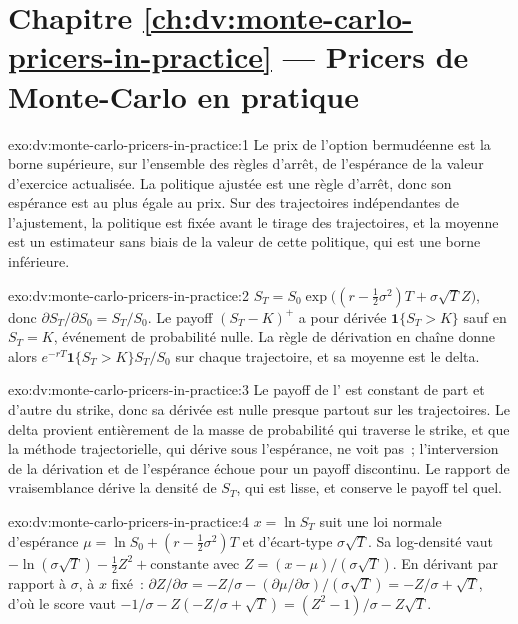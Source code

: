 \section*{Chapitre \ref{ch:dv:monte-carlo-pricers-in-practice} --- Pricers de Monte-Carlo en pratique}

\begin{solution}{exo:dv:monte-carlo-pricers-in-practice:1}
Le prix de l'option bermudéenne est la borne supérieure, sur l'ensemble des règles d'arrêt, de l'espérance de la valeur d'exercice actualisée. La politique ajustée est une règle d'arrêt, donc son
espérance est au plus égale au prix. Sur des trajectoires indépendantes de l'ajustement, la politique est fixée avant le tirage des trajectoires, et la moyenne est un
estimateur sans biais de la valeur de cette politique, qui est une borne inférieure.
\end{solution}

\begin{solution}{exo:dv:monte-carlo-pricers-in-practice:2}
$S_T=S_0\exp\bigl((r-\tfrac12\sigma^2)T+\sigma\sqrt T Z\bigr)$, donc $\partial S_T/\partial S_0=S_T/S_0$. Le payoff $(S_T-K)^+$ a pour dérivée
$\mathbf 1\{S_T>K\}$ sauf en $S_T=K$, événement de probabilité nulle. La règle de dérivation en chaîne donne alors $e^{-rT}\mathbf 1\{S_T>K\}S_T/S_0$ sur chaque trajectoire, et sa
moyenne est le delta.
\end{solution}

\begin{solution}{exo:dv:monte-carlo-pricers-in-practice:3}
Le payoff de l' est constant de part et d'autre du strike, donc sa dérivée est nulle presque partout sur les trajectoires. Le delta provient entièrement de la masse de probabilité
qui traverse le strike, et que la méthode trajectorielle, qui dérive sous l'espérance, ne voit pas~; l'interversion de la dérivation et de l'espérance échoue
pour un payoff discontinu. Le rapport de vraisemblance dérive la densité de $S_T$, qui est lisse, et conserve le payoff tel quel.
\end{solution}

\begin{solution}{exo:dv:monte-carlo-pricers-in-practice:4}
$x=\ln S_T$ suit une loi normale d'espérance $\mu=\ln S_0+(r-\tfrac12\sigma^2)T$ et d'écart-type $\sigma\sqrt T$. Sa log-densité vaut
$-\ln(\sigma\sqrt T)-\tfrac12Z^2+\text{constante}$ avec $Z=(x-\mu)/(\sigma\sqrt T)$. En dérivant par rapport à $\sigma$, à $x$ fixé~:
$\partial Z/\partial\sigma=-Z/\sigma-(\partial\mu/\partial\sigma)/(\sigma\sqrt T)=-Z/\sigma+\sqrt T$, d'où le score vaut
$-1/\sigma-Z(-Z/\sigma+\sqrt T)=(Z^2-1)/\sigma-Z\sqrt T$.
\end{solution}


